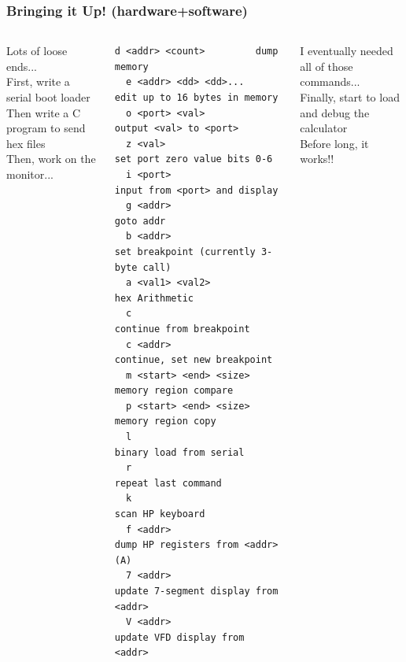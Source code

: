 \documentclass{beamer}
\newcommand{\tred}[1]{\textcolor{my-red}{#1}}
\newcommand{\tgreen}[1]{\textcolor{my-green}{#1}}
\newcommand{\tblue}[1]{\textcolor{my-blue}{#1}}
\begin{document}
\begin{frame}[fragile]
  \frametitle{Bringing it Up!  (hardware+software)}

  \begin{columns}
  \scriptsize
  \vskip -0.2in
  \tgreen{Lots of loose ends...} \\
  \vskip 0.1in
  \tblue{First, write a serial boot loader} \\
  \vskip 0.1in
  \tblue{Then write a C program to send hex files} \\
  \vskip 0.1in
  \tblue{Then, work on the monitor...} \\
\begin{Verbatim}[fontsize=\tiny]
  d <addr> <count>         dump memory
  e <addr> <dd> <dd>...    edit up to 16 bytes in memory
  o <port> <val>           output <val> to <port>
  z <val>                  set port zero value bits 0-6
  i <port>                 input from <port> and display
  g <addr>                 goto addr
  b <addr>                 set breakpoint (currently 3-byte call)
  a <val1> <val2>          hex Arithmetic
  c                        continue from breakpoint
  c <addr>                 continue, set new breakpoint
  m <start> <end> <size>   memory region compare
  p <start> <end> <size>   memory region copy
  l                        binary load from serial
  r                        repeat last command
  k                        scan HP keyboard
  f <addr>                 dump HP registers from <addr> (A)
  7 <addr>                 update 7-segment display from <addr>
  V <addr>                 update VFD display from <addr>
\end{Verbatim}
  \tred{I eventually needed all of those commands...} \\
  \vskip 0.1in
  \tgreen{Finally, start to load and debug the calculator} \\
  \tgreen{Before long, it works!!}


\end{columns}
\end{frame}
\end{document}
